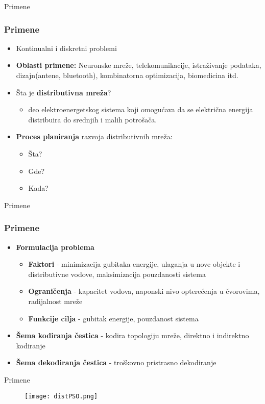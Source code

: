 \documentclass{beamer}
\begin{document}
\begin{frame}{Primene}

\frametitle{Primene}
\begin{itemize}
\item Kontinualni i diskretni problemi
\item \textbf{Oblasti primene:} Neuronske mreže, telekomunikacije, istraživanje podataka, dizajn(antene, bluetooth), kombinatorna optimizacija, biomedicina itd.
\item Šta je \textbf{distributivna mreža}?
\begin{itemize}
    \item deo elektroenergetskog sistema koji omogućava da se električna energija distribuira do srednjih i malih potrošača. 
\end{itemize}
\item \textbf{Proces planiranja} razvoja distributivnih mreža:
\begin{itemize}
    \item Šta?
    \item Gde? 
    \item Kada?
\end{itemize}

\end{itemize}


\end{frame}


\begin{frame}{Primene}

\frametitle{Primene}
\begin{itemize}
\item \textbf{Formulacija problema} 
\begin{itemize}
    \item \textbf{Faktori} - minimizacija gubitaka energije, ulaganja u nove objekte i distributivne vodove, maksimizacija pouzdanosti sistema
    \item \textbf{Ograničenja} - kapacitet vodova, naponski nivo opterećenja u čvorovima, radijalnost mreže
    \item \textbf{Funkcije cilja} - gubitak energije, pouzdanost sistema
\end{itemize}
\item \textbf{Šema kodiranja čestica} - kodira topologiju mreže, direktno i indirektno kodiranje
\item \textbf{Šema dekodiranja čestica} - troškovno pristrasno dekodiranje

\end{itemize}


\end{frame}


\begin{frame}{Primene}
\begin{figure}
\texttt{[image: distPSO.png]}
\end{figure}

\end{frame}
\end{document}
